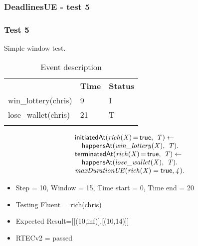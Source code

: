 \documentclass[8pt]{beamer}
\DeclareMathOperator{\val}{=}  %
\def \patsize {}
\def\happensAt{\textsf{\patsize happensAt}}
\def\initiatedAt{\textsf{\patsize initiatedAt}}
\def\terminatedAt{\textsf{\patsize terminatedAt}}
\def\true{\textsf{\patsize true}}
\newenvironment{mysplit}%
  {\arraycolsep 0pt \begin{array}{l}}%
  {\end{array}}
\begin{document}
\begin{frame}
    \frametitle{DeadlinesUE - test 5}
    \subsubsection{Test 5}
    \small
    Simple window test.\linebreak
    \begin{minipage}{0.48\linewidth}
        \begin{table}[t!]
            \caption{Event description}
            \begin{center}

                \begin{tabular}{lll}
                    \hline\noalign{\smallskip}
                    \multicolumn{1}{l}{\textbf{Event}} & \multicolumn{1}{c}{\textbf{Time}} & \multicolumn{1}{c}{\textbf{Status}} \\
                    win\_lottery(chris)& 9 & I\\
                    lose\_wallet(chris)& 21 & T\\
                    \noalign{\smallskip}
                    \hline
                \end{tabular}
            \end{center}
        \end{table}
    \end{minipage}
    \begin{minipage}{0.48\linewidth}
        \begin{align*}
            \begin{mysplit}
                \initiatedAt\mathit{(rich(X)\val\true,\ T) \leftarrow}\\
                \quad    \happensAt\mathit{(win\_lottery(X),\ T).}\\
                \terminatedAt\mathit{(rich(X)\val\true,\ T) \leftarrow}\\
                \quad    \happensAt\mathit{(lose\_wallet(X),\ T)}.\\
                \mathit{maxDurationUE(rich(X)=\true,4)}.\\
            \end{mysplit}
        \end{align*}
    \end{minipage}
    \begin{itemize}
        \item Step = 10, Window = 15, Time start = 0, Time end = 20
        \item Testing Fluent = rich(chris)
        \item Expected Result=[[(10,inf)],[(10,14)]]
        \item RTECv2 = passed
    \end{itemize}
\end{frame}
\end{document}
